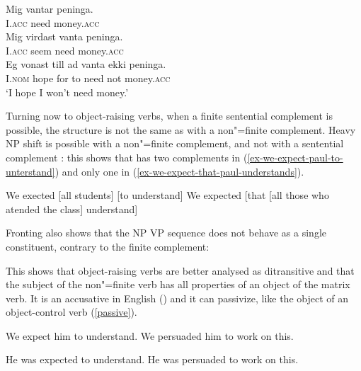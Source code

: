 \documentclass[output=paper
                ,modfonts
                ,nonflat
	        ,collection
	        ,collectionchapter
	        ,collectiontoclongg
 	        ,biblatex
                ,babelshorthands
                ,newtxmath
                ,draftmode
                ,colorlinks, citecolor=brown
]{./langsci/langscibook}
\begin{document}
\begin{exe}
\ex \begin{xlist}
\ex \gll Mig vantar peninga. \\
I.\textsc{acc} need money.\textsc{acc} \\
\ex \gll Mig virdast vanta peninga. \label{need} \\
I.\textsc{acc} seem need money.\textsc{acc} \\
\ex \gll Eg vonast till ad vanta ekki peninga. \label{hope} \\
I.\textsc{nom} hope for to need not money.\textsc{acc} \\
\glt `I hope I won't need money.'
	\end{xlist}
		
\end{exe}

Turning now to object-raising verbs, when a finite sentential complement is possible, the structure is not the same as  with a non"=finite complement. Heavy NP shift is possible with a non"=finite complement, and not with a sentential complement \citet{Bresnan1982}: this shows that  has two complements in (\ref{ex-we-expect-paul-to-unterstand}) and only one in (\ref{ex-we-expect-that-paul-understands}).

\eal
\ex We exected [all students] [to understand]
\ex We expected [that [all those who atended the class] understand]
\zl

Fronting also shows that the NP VP sequence does not behave as a single constituent, contrary to the finite complement:

\eal
{}
\zl


This shows that object-raising verbs are better analysed as ditransitive and that the subject of the non"=finite verb has all properties of an object of the matrix verb. It is an accusative in English () and it can passivize, like the object of an object-control verb (\ref{passive}).

\begin{exe}
\ex
\begin{xlist}
\ex We expect him to understand.
\ex  We persuaded him to work on this.
\end{xlist}
\ex \begin{xlist} \label{passive}
\ex  He was expected to understand.
\ex  He was persuaded to work on this.
\end{xlist}
	
\end{exe}
\end{document}
